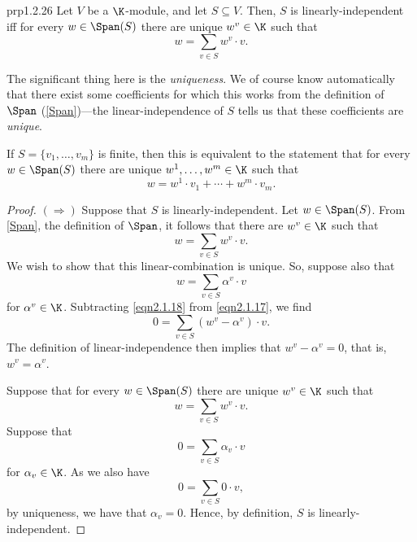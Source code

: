 \begin{prp}{}{prp1.2.26}
	Let $V$ be a $\K$-module, and let $S\subseteq V$.  Then, $S$ is linearly-independent iff for every $w\in \Span (S)$ there are unique $w^v\in \K$ such that
	\begin{equation}
	w=\sum _{v\in S}w^v\cdot v.
	\end{equation}
	\begin{rmk}
		The significant thing here is the \emph{uniqueness}.  We of course know automatically that there exist some coefficients for which this works from the definition of $\Span$ (\cref{Span})---the linear-independence of $S$ tells us that these coefficients are \emph{unique}.
	\end{rmk}
	\begin{rmk}
		If $S=\{ v_1,\ldots ,v_m\}$ is finite, then this is equivalent to the statement that for every $w\in \Span (S)$ there are unique $w^1,\ldots ,w^m\in \K$ such that
		\begin{equation}
		w=w^1\cdot v_1+\cdots +w^m\cdot v_m.
		\end{equation}
	\end{rmk}
	\begin{proof}
		$(\Rightarrow )$ Suppose that $S$ is linearly-independent.  Let $w\in \Span (S)$.  From \cref{Span}, the definition of $\Span$, it follows that there are $w^v\in \K$ such that
		\begin{equation}\label{eqn2.1.17}
		w=\sum _{v\in S}w^v\cdot v.
		\end{equation}
		We wish to show that this linear-combination is unique.  So, suppose also that
		\begin{equation}\label{eqn2.1.18}
		w=\sum _{v\in S}\alpha ^v\cdot v
		\end{equation}
		for $\alpha ^v\in \K$.  Subtracting \eqref{eqn2.1.18} from \eqref{eqn2.1.17}, we find
		\begin{equation}
		0=\sum _{v\in S}(w^v-\alpha ^v)\cdot v.
		\end{equation}
		The definition of linear-independence then implies that $w^v-\alpha ^v=0$, that is, $w^v=\alpha ^v$.
		
		\blni
		Suppose that for every $w\in \Span (S)$ there are unique $w^v\in \K$ such that
		\begin{equation}
		w=\sum _{v\in S}w^v\cdot v.
		\end{equation}
		Suppose that
		\begin{equation}
		0=\sum _{v\in S}\alpha _v\cdot v
		\end{equation}
		for $\alpha _v\in \K$.  As we also have
		\begin{equation}
		0=\sum _{v\in S}0\cdot v,
		\end{equation}
		by uniqueness, we have that $\alpha _v=0$.  Hence, by definition, $S$ is linearly-independent.
	\end{proof}
\end{prp}

